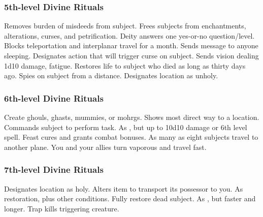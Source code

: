 \subsubsection{5th-level Divine Rituals}
\begin{rituallist}
    \F\M Removes burden of misdeeds from subject.
     Frees subjects from enchantments, alterations, curses, and petrification.
     Deity answers one yes-or-no question/level.
     Blocks teleportation and interplanar travel for a month.
     Sends message to anyone sleeping.
     Designates action that will trigger curse on subject.
     Sends vision dealing 1d10 damage, fatigue.
     Restores life to subject who died as long as thirty days ago.
    \F Spies on subject from a distance.
     Designates location as unholy.
\end{rituallist}

\subsubsection{6th-level Divine Rituals}
\begin{rituallist}
     Create ghouls, ghasts, mummies, or mohrgs.
     Shows most direct way to a location.
     Commands subject to perform task.
     As , but up to 10d10 damage or 6th level spell.
     Feast cures and grants combat bonuses.
    \F As many as eight subjects travel to another plane.
     You and your allies turn vaporous and travel fast.
\end{rituallist}

\subsubsection{7th-level Divine Rituals}
\begin{rituallist}
     Designates location as holy.
     Alters item to transport its possessor to you.
     As restoration, plus other conditions.
     Fully restore dead subject.
     As , but faster and longer.
     Trap kills triggering creature.
\end{rituallist}

